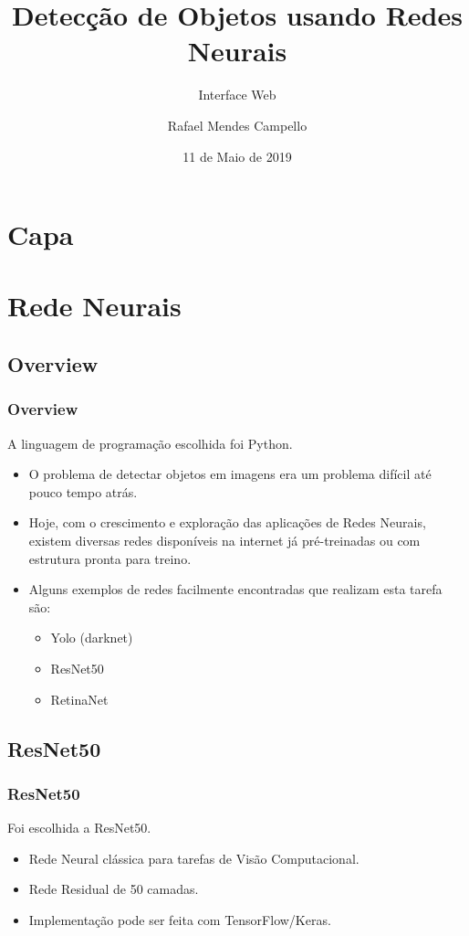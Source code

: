 \documentclass{beamer}
\title[Detector de Objetos]{Detecção de Objetos usando Redes Neurais}
\subtitle{Interface Web}
\author{Rafael Mendes Campello}
\date{11 de Maio de 2019}
\begin{document}
	\section{Capa}
	\begin{frame}
		\titlepage

	\end{frame}

	\section{Rede Neurais}
	\subsection{Overview}
	\begin{frame}
		\frametitle{Overview}
		
		A linguagem de programação escolhida foi Python.
		
		\begin{itemize}
			\item O problema de detectar objetos em imagens era um problema difícil até pouco tempo atrás.
			\item Hoje, com o crescimento e exploração das aplicações de Redes Neurais, existem diversas redes disponíveis na internet já pré-treinadas ou com estrutura pronta para treino.
			\item Alguns exemplos de redes facilmente encontradas que realizam esta tarefa são:
			\begin{itemize}
				\item Yolo (darknet)
				\item ResNet50
				\item RetinaNet
			\end{itemize}
		\end{itemize}
	\end{frame}
	
	\subsection{ResNet50}
	\begin{frame}
		\frametitle{ResNet50}
		Foi escolhida a ResNet50.
		
		\begin{itemize}
			\item Rede Neural clássica para tarefas de Visão Computacional.
			\item Rede Residual de 50 camadas.
			\item Implementação pode ser feita com TensorFlow/Keras.
		\end{itemize}
	\end{frame}
	
\end{document}
